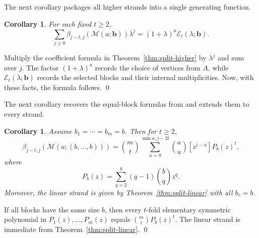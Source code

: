 \documentclass[12pt]{article}
\renewenvironment{proof}{{\bf \noindent Proof.}}{\qed}
\newtheorem{corollary}[theorem]{Corollary}
\theoremstyle{definition}
\theoremstyle{remark}
\newcommand{\EE}{\mathcal{E}}
\newcommand{\MM}{\mathcal{M}}
\newcommand{\bk}[1]{\mathbf{#1}}
\begin{document}
	 \medskip The next corollary packages all higher strands into a single generating function.
	
	\begin{corollary}\label{cor:split-gen}
		For each fixed $t\geq 2$,
		$$
		\sum_{j\geq 0}\beta_{j-t,j}(\MM(a;\bk{b}))\lambda^j
		=(1+\lambda)^a\EE_t(\lambda;\bk{b}).
		$$
	\end{corollary}
	
	\begin{proof}
		Multiply the coefficient formula in Theorem~\ref{thm:split-higher} by $\lambda^j$ and sum over $j$. The factor $(1+\lambda)^a$ records the choice of vertices from $A$, while $\EE_t(\lambda;\bk{b})$ records the selected blocks and their internal multiplicities. Now, with these facts, the formula follows.
	\end{proof}
	
	 \medskip The next corollary recovers the equal-block formulas from \cite{Rather2024} and extends them to every strand.
	
	\begin{corollary}\label{cor:split-equal}
		Assume $b_1=\cdots=b_m=b$. Then for $t\geq 2$,
		$$
		\beta_{j-t,j}(\MM(a;(b,\dots,b)))
		= \binom{m}{t}
		\sum_{u=0}^{\min{a,j-2t}}
		\binom{a}{u}[z^{j-u}]P_b(z)^t,
		$$
		where
		$$
		P_b(z)=\sum_{q=2}^{b}(q-1)\binom{b}{q}z^q.
		$$
		Moreover, the linear strand is given by Theorem~\ref{thm:split-linear} with all $b_r=b$.
	\end{corollary}
	
	\begin{proof}
		If all blocks have the same size $b$, then every $t$-fold elementary symmetric polynomial in $P_1(z),\dots,P_m(z)$ equals $\binom{m}{t}P_b(z)^t$. The linear strand is immediate from Theorem~\ref{thm:split-linear}.
	\end{proof}
	
\end{document}
